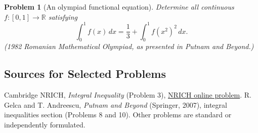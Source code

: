 \documentclass[11pt]{article}
\theoremstyle{plaincolon}
\theoremstyle{definitioncolon}
\newtheorem{problem}{Problem} %
\theoremstyle{remarkcolon}
\numberwithin{equation}{section}
\newcommand{\RR}{\mathbb{R}}
\begin{document}
\begin{problem}[An olympiad functional equation]
Determine all continuous $f:[0,1]\to\RR$ satisfying
\[
\int_0^1 f(x)\,dx=\frac13+\int_0^1 f(x^2)^2\,dx.
\]
\emph{(1982 Romanian Mathematical Olympiad, as presented in \emph{Putnam and Beyond}.)}
\end{problem}

\subsection*{Sources for Selected Problems}
\small
Cambridge NRICH, \emph{Integral Inequality} (Problem 3),
\href{https://nrich.maths.org/problems/integral-inequality}{NRICH online problem}.
R. Gelca and T. Andreescu, \emph{Putnam and Beyond} (Springer, 2007), integral inequalities section (Problems 8 and 10). Other problems are standard or independently formulated.
\normalsize
\end{document}
